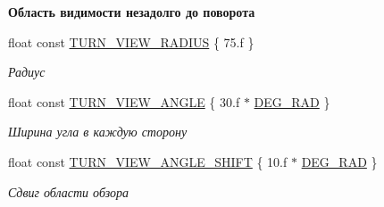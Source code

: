 \begin{Indent}\textbf{ Область видимости незадолго до поворота}\par
\begin{DoxyCompactItemize}
\item 
\mbox{\label{namespacertm_ae00afb2f4895bee23fd6b18359aa0923}} 
float const \hyperlink{namespacertm_ae00afb2f4895bee23fd6b18359aa0923}{T\+U\+R\+N\+\_\+\+V\+I\+E\+W\+\_\+\+R\+A\+D\+I\+US} \{ 75.f \}
\begin{DoxyCompactList}\small\item\em Радиус \end{DoxyCompactList}\item 
\mbox{\label{namespacertm_a2bed018eeea8988507e7a65059a3ff98}} 
float const \hyperlink{namespacertm_a2bed018eeea8988507e7a65059a3ff98}{T\+U\+R\+N\+\_\+\+V\+I\+E\+W\+\_\+\+A\+N\+G\+LE} \{ 30.f $\ast$ \hyperlink{namespacertm_a797faf3037681ed7bc153db9eca6155e}{D\+E\+G\+\_\+\+R\+AD} \}
\begin{DoxyCompactList}\small\item\em Ширина угла в каждую сторону \end{DoxyCompactList}\item 
\mbox{\label{namespacertm_ae725fc045c1a7417fa006a279e675deb}} 
float const \hyperlink{namespacertm_ae725fc045c1a7417fa006a279e675deb}{T\+U\+R\+N\+\_\+\+V\+I\+E\+W\+\_\+\+A\+N\+G\+L\+E\+\_\+\+S\+H\+I\+FT} \{ 10.f $\ast$ \hyperlink{namespacertm_a797faf3037681ed7bc153db9eca6155e}{D\+E\+G\+\_\+\+R\+AD} \}
\begin{DoxyCompactList}\small\item\em Сдвиг области обзора \end{DoxyCompactList}\end{DoxyCompactItemize}
\end{Indent}

